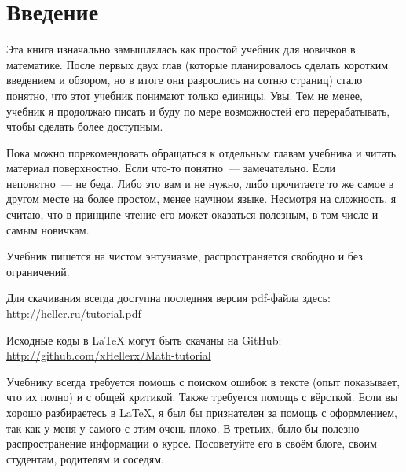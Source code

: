 \chapter*{Введение}

Эта книга изначально замышлялась как простой учебник для новичков в математике. После первых двух глав (которые планировалось сделать коротким введением и обзором, но в итоге они разрослись на сотню страниц) стало понятно, что этот учебник понимают только единицы. Увы. Тем не менее, учебник я продолжаю писать и буду по мере возможностей его перерабатывать, чтобы сделать более доступным.

Пока можно порекомендовать обращаться к отдельным главам учебника и читать материал поверхностно. Если что-то понятно~--- замечательно. Если непонятно~--- не беда. Либо это вам и не нужно, либо прочитаете то же самое в другом месте на более простом, менее научном языке. Несмотря на сложность, я считаю, что в принципе чтение его может оказаться полезным, в том числе и самым новичкам.

Учебник пишется на чистом энтузиазме, распространяется свободно и без ограничений.

Для скачивания всегда доступна последняя версия pdf-файла здесь: \url{http://heller.ru/tutorial.pdf}

Исходные коды в \LaTeX{} могут быть скачаны на GitHub: \linebreak
\url{http://github.com/xHellerx/Math-tutorial}

Учебнику всегда требуется помощь с поиском ошибок в тексте (опыт показывает, что их полно) и с общей критикой. Также требуется помощь с вёрсткой. Если вы хорошо разбираетесь в \LaTeX, я был бы признателен за помощь с оформлением, так как у меня у самого с этим очень плохо. В-третьих, было бы полезно распространение информации о курсе. Посоветуйте его в своём блоге, своим студентам, родителям и соседям.
